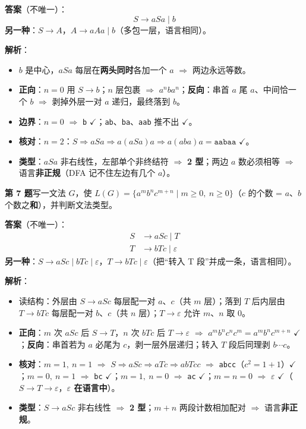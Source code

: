 \documentclass[12pt,a4paper,fontset=windows]{ctexart}
\newcommand{\ok}{\ensuremath{\checkmark}}
\newcommand{\imp}{\ensuremath{\Rightarrow}}
\begin{document}
\textbf{答案}（不唯一）：
\[ S \to aSa \mid b \]
\textbf{另一种}：$S \to A$，$A \to aAa \mid b$（多包一层，语言相同）。

\textbf{解析}：
\begin{itemize}
\item $b$ 是中心，$aSa$ 每层在\textbf{两头同时}各加一个 $a$ \imp{} 两边永远等数。
\item \textbf{正向}：$n=0$ 用 $S \to b$；$n$ 层包裹 \imp{} $a^n b a^n$；\textbf{反向}：串首 $a$ 尾 $a$、中间恰一个 $b$ \imp{} 剥掉外层一对 $a$ 递归，最终落到 $b$。
\item \textbf{边界}：$n=0$ \imp{} \texttt{b} \ok；\texttt{ab}、\texttt{ba}、\texttt{aab} 推不出 \ok。
\item \textbf{核对}：$n=2$：$S \Rightarrow aSa \Rightarrow a(aSa)a \Rightarrow a(aba)a = \texttt{aabaa}$ \ok。
\item \textbf{类型}：$aSa$ 非右线性，左部单个非终结符 \imp{} \textbf{2 型}；两边 $a$ 数必须相等 \imp{} 语言\textbf{非正规}（DFA 记不住左边有几个 $a$）。
\end{itemize}

\begin{qbox}
{\large\bfseries 第 7 题}\quad 写一文法 $G$，使 $L(G)=\{a^m b^n c^{m+n} \mid m \ge 0,\ n \ge 0\}$（$c$ 的个数 = $a$、$b$ 个数之\textbf{和}），并判断文法类型。
\end{qbox}

\textbf{答案}（不唯一）：
\[
\begin{aligned}
S &\to aSc \mid T\\
T &\to bTc \mid \varepsilon
\end{aligned}
\]
\textbf{另一种}：$S \to aSc \mid bTc \mid \varepsilon$，$T \to bTc \mid \varepsilon$（把``转入 T 段''并成一条，语言相同）。

\textbf{解析}：
\begin{itemize}
\item 读结构：外层由 $S \to aSc$ 每层配一对 $a$、$c$（共 $m$ 层）；落到 $T$ 后内层由 $T \to bTc$ 每层配一对 $b$、$c$（共 $n$ 层）；$T \to \varepsilon$ 允许 $m$、$n$ 取 $0$。
\item \textbf{正向}：$m$ 次 $aSc$ 后 $S \to T$，$n$ 次 $bTc$ 后 $T \to \varepsilon$ \imp{} $a^m b^n c^{n} c^{m} = a^m b^n c^{m+n}$ \ok；\textbf{反向}：串首若为 $a$ 必尾为 $c$，剥一层外层递归；转入 $T$ 段后同理剥 $b \cdots c$。
\item \textbf{核对}：$m=1,\ n=1$ \imp{} $S \Rightarrow aSc \Rightarrow aTc \Rightarrow abTcc$ \imp{} \texttt{abcc}（$c^2 = 1+1$）\ok；$m=0,\ n=1$ \imp{} \texttt{bc} \ok；$m=1,\ n=0$ \imp{} \texttt{ac} \ok；$m=n=0$ \imp{} \textbf{$\varepsilon$} \ok（$S \to T \to \varepsilon$，\textbf{$\varepsilon$ 在语言中}）。
\item \textbf{类型}：$S \to aSc$ 非右线性 \imp{} \textbf{2 型}；$m+n$ 两段计数相加配对 \imp{} 语言\textbf{非正规}。
\end{itemize}
\end{document}
